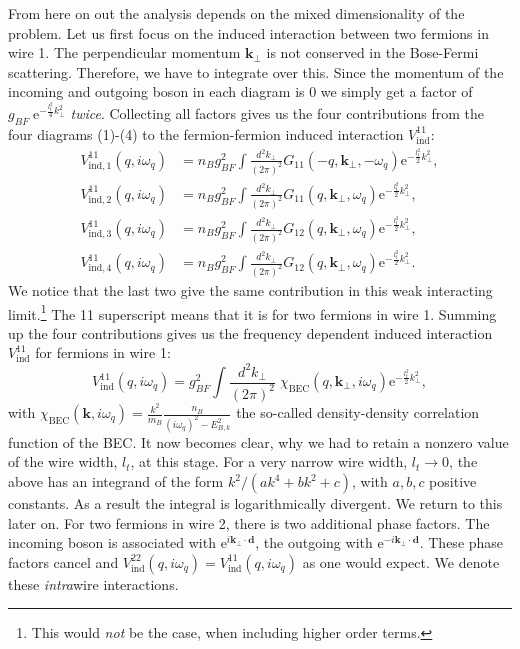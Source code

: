 From here on out the analysis depends on the mixed dimensionality of the problem. Let us first focus on the induced interaction between two fermions in wire 1. The perpendicular momentum $\mathbf{k}_{\perp}$ is not conserved in the Bose-Fermi scattering. Therefore, we have to integrate over this. Since the momentum of the incoming and outgoing boson in each diagram is 0 we simply get a factor of $g_{BF}\; \text{e}^{-\frac{l_t^2}{4}k_\perp^2}$ \textit{twice}. Collecting all factors gives us the four contributions from the four diagrams (1)-(4) to the fermion-fermion induced interaction $V_{\text{ind}}^{11}$: 
\begin{align}
V^{11}_{\text{ind}, 1}(q,i\omega_q) &= n_Bg_{BF}^2\int\frac{d^2k_\perp}{(2\pi)^2}G_{11}(-q,\mathbf{k}_\perp,-\omega_q)\text{e}^{-\frac{l_t^2}{2}k_\perp^2}, \nonumber \\
V^{11}_{\text{ind}, 2}(q,i\omega_q) &= n_Bg_{BF}^2\int\frac{d^2k_\perp}{(2\pi)^2}G_{11}(q,\mathbf{k}_\perp,\omega_q)\text{e}^{-\frac{l_t^2}{2}k_\perp^2}, \nonumber \\
V^{11}_{\text{ind}, 3}(q,i\omega_q) &= n_Bg_{BF}^2\int\frac{d^2k_\perp}{(2\pi)^2}G_{12}(q,\mathbf{k}_\perp,\omega_q)\text{e}^{-\frac{l_t^2}{2}k_\perp^2}, \nonumber \\
V^{11}_{\text{ind}, 4}(q,i\omega_q) &= n_Bg_{BF}^2\int\frac{d^2k_\perp}{(2\pi)^2}G_{12}(q,\mathbf{k}_\perp,\omega_q)\text{e}^{-\frac{l_t^2}{2}k_\perp^2}. 
\end{align}
We notice that the last two give the same contribution in this weak interacting limit.\footnote{This would \textit{not} be the case, when including higher order terms.} The 11 superscript means that it is for two fermions in wire 1. Summing up the four contributions gives us the frequency dependent induced interaction $V^{11}_{\text{ind}}$ for fermions in wire 1:
\begin{equation}
V^{11}_{\text{ind}}(q,i\omega_q) = g_{BF}^2\int\frac{d^2k_\perp}{(2\pi)^2}\; \chi_\text{BEC}(q,\mathbf{k}_\perp,i\omega_q)\text{e}^{-\frac{l_t^2}{2}k_\perp^2}, 
\label{eq.V11indXBEC}
\end{equation}
with $\chi_\text{BEC}(\mathbf{k},i\omega_q) = \frac{k^2}{m_B}\frac{n_B}{(i\omega_q)^2 - E_{B,k}^2}$ the so-called density-density correlation function of the BEC. It now becomes clear, why we had to retain a nonzero value of the wire width, $l_t$, at this stage. For a very narrow wire width, $l_t\to 0$, the above has an integrand of the form $k^2/(ak^4 + bk^2 + c)$, with $a, b, c$ positive constants. As a result the integral is logarithmically divergent. We return to this later on. For two fermions in wire 2, there is two additional phase factors. The incoming boson is associated with $\text{e}^{i\mathbf{k}_\perp\cdot \mathbf{d}}$, the outgoing with $\text{e}^{-i\mathbf{k}_\perp\cdot \mathbf{d}}$. These phase factors cancel and $V^{22}_{\text{ind}}(q,i\omega_q) = V^{11}_{\text{ind}}(q,i\omega_q)$ as one would expect. We denote these \textit{intra}wire interactions. 

